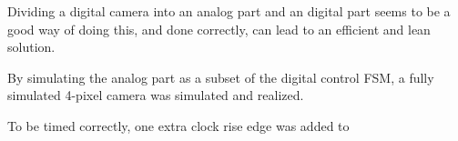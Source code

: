 Dividing a digital camera into an analog part and an digital part seems to be a good way of doing this, and done correctly, can lead to an efficient and lean solution. 

By simulating the analog part as a subset of the digital control FSM, a fully simulated 4-pixel camera was simulated and realized. 

To be timed correctly, one extra clock rise edge was added to 
